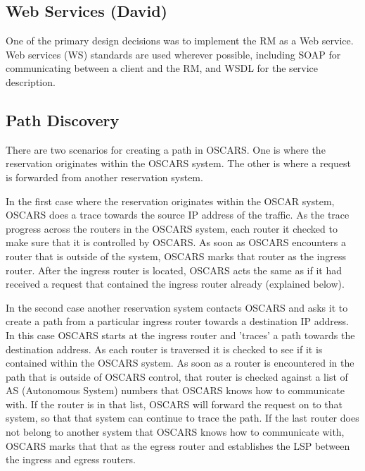 \documentclass[conference]{IEEEtran}
\begin{document}
\subsection{Web Services (David)}

One of the primary design decisions was to implement the RM as a Web service.
Web services (WS) standards are used wherever possible, including SOAP
for communicating between a client and the RM, and WSDL for the service
description. 

\subsection{Path Discovery}
There are two scenarios for creating a path in OSCARS.  One is where the
reservation originates within the OSCARS system.  The other is where a request
is forwarded from another reservation system. 

In the first case where the reservation originates within the OSCAR system,
OSCARS does a trace towards the source IP address of the traffic. As the trace
progress across the routers in the OSCARS system, each router it checked to make
sure that it is controlled by OSCARS. As soon as OSCARS encounters a router that
is outside of the system, OSCARS marks that router as the ingress router. After
the ingress router is located, OSCARS acts the same as if it had received a
request that contained the ingress router already (explained below).

In the second case another reservation system contacts OSCARS and asks it to
create a path from a particular ingress router towards a destination IP address.
In this case OSCARS starts at the ingress router and 'traces' a path towards the
destination address. As each router is traversed it is checked to see if it is
contained within the OSCARS system. As soon as a router is encountered in the
path that is outside of OSCARS control, that router is checked against a list of
AS (Autonomous System) numbers that OSCARS knows how to communicate with. If the
router is in that list, OSCARS will forward the request on to that system, so
that that system can continue to trace the path. If the last router does not
belong to another system that OSCARS knows how to communicate with, OSCARS marks
that that as the egress router and establishes the LSP between the ingress and
egress routers.
\end{document}
